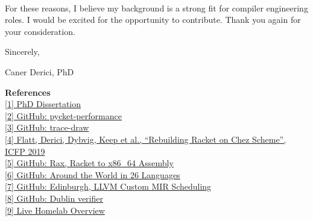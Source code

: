 \paragraph{} %
For these reasons, I believe my background is a strong fit for compiler engineering roles. I would be excited for the opportunity to contribute. Thank you again for your consideration.

\vspace{1.2em}

Sincerely,

Caner Derici, PhD

\vfill

{\small
	\noindent\textbf{References} \\[0.25em]
	\noindent \href{\dissertationurl}{[1] PhD Dissertation} \\
	\noindent \href{\pycketperfurl}{[2] GitHub: pycket-performance} \\
	\noindent \href{\tracedrawurl}{[3] GitHub: trace-draw} \\
	\noindent \href{\icfpreporturl}{[4] Flatt, Derici, Dybvig, Keep et al., ``Rebuilding Racket on Chez Scheme'', ICFP 2019} \\
	\noindent \href{\raxurl}{[5] GitHub: Rax, Racket to x86\_64 Assembly} \\
    \noindent \href{\atwurl}{[6] GitHub: Around the World in 26 Languages} \\
\noindent \href{\edinburghurl}{[7] GitHub: Edinburgh, LLVM Custom MIR Scheduling} \\
	\noindent \href{\dublinlang}{[8] GitHub: Dublin verifier} \\
\noindent \href{\homelaburl}{[9] Live Homelab Overview} \\
}



